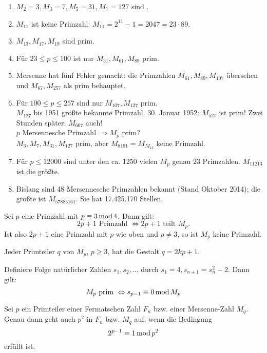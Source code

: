 \begin{enumerate}[(1)]
	\item $M_2 = 3, M_3 = 7, M_5 = 31, M_7 = 127$ sind . 
	\item $M_{11}$ ist keine Primzahl: $M_{11} = 2^{11} - 1 = 2047 = 23 \cdot 89$.
	\item $M_{13}, M_{17}, M_{19}$ sind prim.
	\item Für $23 \leq p \leq 100$ ist nur $M_{31}, M_{61}, M_{89}$ prim.
	\item Mersenne hat fünf Fehler gemacht: die Primzahlen $M_{61}, M_{89}, M_{107}$ übersehen und $M_{67}, M_{257}$ als prim behauptet.
	\item Für $100 \leq p \leq 257$ sind nur $M_{107}, M_{127}$ prim. \\
	$M_{127}$ bis 1951 größte bekannte Primzahl. 30. Januar 1952: $M_{521}$ ist prim! Zwei Stunden später: $M_{607}$ auch! \\
	$p$ Mersennesche Primzahl $\Rightarrow M_p$ prim? \\
	$M_3, M_7, M_{31}, M_{127}$ prim, aber $M_{8191} = M_{M_{13}}$ keine Primzahl.
	\item Für $p \leq 12000$ sind unter den ca. 1250 vielen $M_p$ genau 23 Primzahlen. $M_{11213}$ ist die größte.
	\item Bislang sind 48 Mersennesche Primzahlen bekannt (Stand Oktober 2014); die größte ist $M_{57885161}$. Sie hat 17.425.170 Stellen.
\end{enumerate}

\setcounter{countfalko}{3}
\begin{falko} \label{F7.4}
	Sei $p$ eine Primzahl mit $p \equiv 3 \operatorname{mod} 4$. Dann gilt:
	\[2p + 1 \text{ Primzahl } \Leftrightarrow 2p+1 \text{ teilt } M_p. \]
	Ist also $2p+1$ eine Primzahl mit $p$ wie oben und $p \neq 3$, so ist $M_p$ keine Primzahl.
\end{falko}

	Jeder Primteiler $q$ von $M_p$, $p \geq 3$, hat die Gestalt $q = 2kp + 1$.
	
\begin{falko} \label{F7.5}
	Definiere Folge natürlicher Zahlen $s_1, s_2, \dots$ durch $s_1 = 4, s_{n+1} = s_n^2 - 2$. Dann gilt:
	\[ M_p \text{ prim } \Leftrightarrow s_{p-1} \equiv 0 \operatorname{mod} M_p \]
\end{falko}

\setcounter{countfalko}{2}
\begin{falko} \label{F7.3}
	Sei $p$ ein Primteiler einer Fermatschen Zahl $F_n$ bzw. einer Mersenne-Zahl $M_q$. Genau dann geht auch $p^2$ in $F_n$ bzw. $M_q$ auf, wenn die Bedingung 
	\begin{equation}
		2^{p-1} \equiv 1 \operatorname{mod} p^2 \label{eq_W}
	\end{equation}
	erfüllt ist.
\end{falko}


